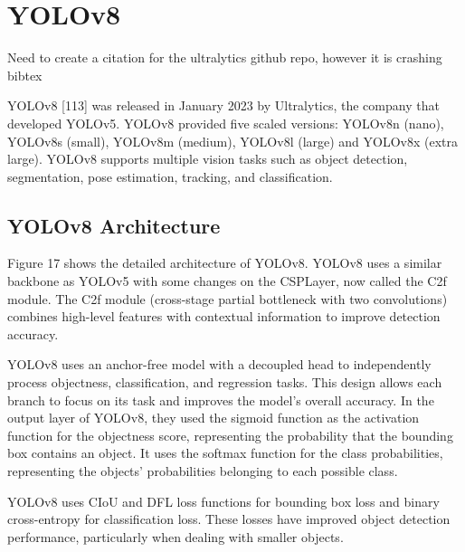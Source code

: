 \documentclass{article}
\begin{document}

\section{YOLOv8}


Need to create a citation for the ultralytics github repo, however it is crashing bibtex

YOLOv8 [113] was released in January 2023 by Ultralytics, the company that developed YOLOv5. YOLOv8 provided five scaled versions: YOLOv8n (nano), YOLOv8s (small), YOLOv8m (medium), YOLOv8l (large) and YOLOv8x (extra large). YOLOv8 supports multiple vision tasks such as object detection, segmentation, pose estimation, tracking, and classification.

\subsection{YOLOv8 Architecture}

Figure 17 shows the detailed architecture of YOLOv8. YOLOv8 uses a similar backbone as YOLOv5 with some changes on the CSPLayer, now called the C2f module. The C2f module (cross-stage partial bottleneck with two convolutions) combines high-level features with contextual information to improve detection accuracy.

YOLOv8 uses an anchor-free model with a decoupled head to independently process objectness, classification, and regression tasks. This design allows each branch to focus on its task and improves the model’s overall accuracy. In the output layer of YOLOv8, they used the sigmoid function as the activation function for the objectness score, representing the probability that the bounding box contains an object. It uses the softmax function for the class probabilities, representing the objects’ probabilities belonging to each possible class.

YOLOv8 uses CIoU \cite{zheng2020distance} and DFL \cite{li2020generalized} loss functions for bounding box loss and binary cross-entropy for classification loss. These losses have improved object detection performance, particularly when dealing with smaller objects.
\end{document}
